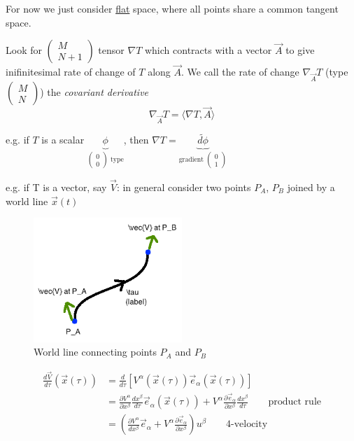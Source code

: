 \documentclass[a4paper]{article} %
\newcommand{\pmx}[1]{
\begin{pmatrix}
#1
\end{pmatrix}
}
\renewcommand{\tilde}{\widetilde}
\begin{document}
For now we just consider \underline{flat} space, where all points share a common tangent space.


Look for $\pmx{M\\N+1}$ tensor $\nabla T$ which contracts with a vector $\vec{A}$ to give inifinitesimal rate of change of $T$ along $\vec{A}$. We call the rate of change $\nabla_{\vec{A}}T$ (type $\pmx{M\\N}$) the \emph{covariant derivative}
\begin{equation}
\nabla_{\vec{A}} T=\langle \nabla T,\vec{A}\rangle
\end{equation}

e.g. if $T$ is a scalar $\underbrace{\phi}_{\pmx{0\\0}\text{ type}}$, then $\nabla T=\underbrace{\tilde{d\phi}}_{\text{gradient }\pmx{0\\1}}$

e.g. if T is a vector, say $\vec{V}$: in general consider two points $P_A$, $P_B$ joined by a world line $\vec{x}(t)$

\begin{figure}[h]
\centering
\includegraphics[width=0.5\textwidth]{images/world-line.png}
\caption{World line connecting points $P_A$ and $P_B$}
\end{figure}

\begin{align*}
\frac{d\vec{V}}{d\tau}(\vec{x}(\tau))&=\frac{d}{d\tau}\left[V^{\alpha}(\vec{x}(\tau))\vec{e}_{\alpha}
(\vec{x}(\tau))\right]\\
&=\frac{\partial V^{\alpha}}{\partial x^{\beta}}\frac{dx^{\beta}}{d\tau}\vec{e}_{\alpha}(\vec{x}(\tau))
+V^{\alpha}\frac{\partial \vec{e}_{\alpha}}{\partial x^{\beta}}\frac{dx^{\beta}}{d\tau}\qquad\text{product rule}\\
&=\left(\frac{\partial V^{\alpha}}{dx^{\beta}}\vec{e}_{\alpha}+V^{\alpha}\frac{\partial \vec{e}_{\alpha}}{\partial x^{\beta}}\right)u^{\beta}\qquad\text{4-velocity}\label{diff eqn1}
\end{align*}
\end{document}
